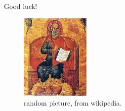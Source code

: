 \documentclass{article}\usepackage[]{graphicx}\usepackage[]{color}
\begin{document}
\begin{center}
Good luck!
\end{center}

\begin{figure}[h]
\centering
\includegraphics[width=0.3\textwidth]{Hippocrate.jpg}
\caption{\label{fig:owl}random picture, from wikipedia.}
\end{figure}
\end{document}
